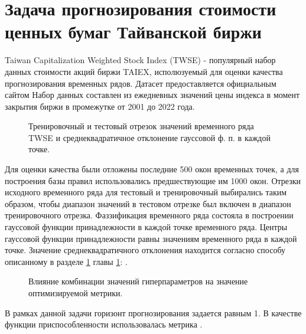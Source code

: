 \section{Задача прогнозирования стоимости ценных бумаг Тайванской биржи}

\cite{Sadaei2016}

Taiwan Capitalization Weighted Stock Index (TWSE) - популярный набор данных стоимости акций биржи TAIEX, исполюзуемый для оценки качества прогнозирования временных рядов. Датасет предоставляется официальным сайтом  Набор данных составлен из ежедневных значений цены индекса в момент закрытия биржи в промежутке от 2001 до 2022 года.

\begin{figure}[hbt] 	
	\label{fig:twse-ns-fuzzification}
	\centering
	\caption{Тренировочный и тестовый отрезок значений временного ряда TWSE и среднеквадратичное отклонение гауссовой ф. п. в каждой точке.}
\end{figure}

 Для оценки качества были отложены последние 500 окон временных точек, а для построения базы правил использовались предшествующие им 1000 окон. Отрезки исходного временного ряда для тестовый и тренировочный выбирались таким образом, чтобы диапазон значений в тестовом отрезке был включен в диапазон тренировочного отрезка. Фаззификация временного ряда состояла в построении гауссовой функции принадлежности в каждой точке временного ряда. Центры гауссовой функции принадлежности равны значениям временного ряда в каждой точке. Значение среднеквадратичного отклонения находится согласно способу описанному в разделе \ref{} главы \ref{}: .
 
 \begin{figure}[hbt] 	
 	\label{fig:twse-optuna-parallel-score}
 	\centering
 	\caption{Влияние комбинации значений гиперпараметров на значение оптимизируемой метрики.}
 \end{figure}
 
В рамках данной задачи горизонт прогнозирования задается равным 1. В качестве функции приспособленности использовалась метрика .


